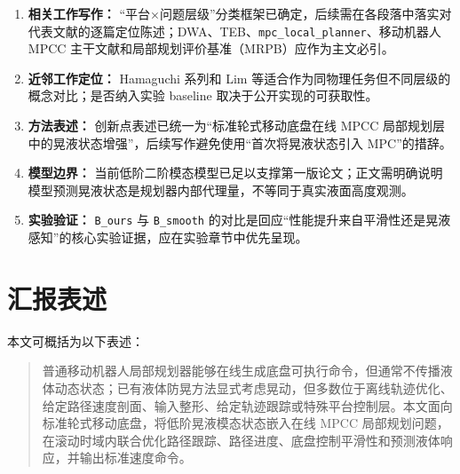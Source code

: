 \documentclass[12pt,a4paper]{ctexart}
\newcommand{\MPCC}{MPCC}
\newcommand{\MPC}{MPC}
\newcommand{\DWA}{DWA}
\newcommand{\TEB}{TEB}
\begin{document}
\begin{enumerate}
  \item \textbf{相关工作写作：} “平台$\times$问题层级”分类框架已确定，后续需在各段落中落实对代表文献的逐篇定位陈述；\DWA{}、\TEB{}、\texttt{mpc\_local\_planner}、移动机器人 \MPCC{} 主干文献和局部规划评价基准（MRPB）应作为主文必引。
  \item \textbf{近邻工作定位：} Hamaguchi 系列和 Lim 等适合作为同物理任务但不同层级的概念对比；是否纳入实验 baseline 取决于公开实现的可获取性。
  \item \textbf{方法表述：} 创新点表述已统一为“标准轮式移动底盘在线 \MPCC{} 局部规划层中的晃液状态增强”，后续写作避免使用“首次将晃液状态引入 \MPC{}”的措辞。
  \item \textbf{模型边界：} 当前低阶二阶模态模型已足以支撑第一版论文；正文需明确说明模型预测晃液状态是规划器内部代理量，不等同于真实液面高度观测。
  \item \textbf{实验验证：} \texttt{B\_ours} 与 \texttt{B\_smooth} 的对比是回应“性能提升来自平滑性还是晃液感知”的核心实验证据，应在实验章节中优先呈现。
\end{enumerate}

\section{汇报表述}
\label{sec:short-summary}

本文可概括为以下表述：
\begin{quote}
普通移动机器人局部规划器能够在线生成底盘可执行命令，但通常不传播液体动态状态；已有液体防晃方法显式考虑晃动，但多数位于离线轨迹优化、给定路径速度剖面、输入整形、给定轨迹跟踪或特殊平台控制层。本文面向标准轮式移动底盘，将低阶晃液模态状态嵌入在线 \MPCC{} 局部规划问题，在滚动时域内联合优化路径跟踪、路径进度、底盘控制平滑性和预测液体响应，并输出标准速度命令。
\end{quote}



\end{document}
